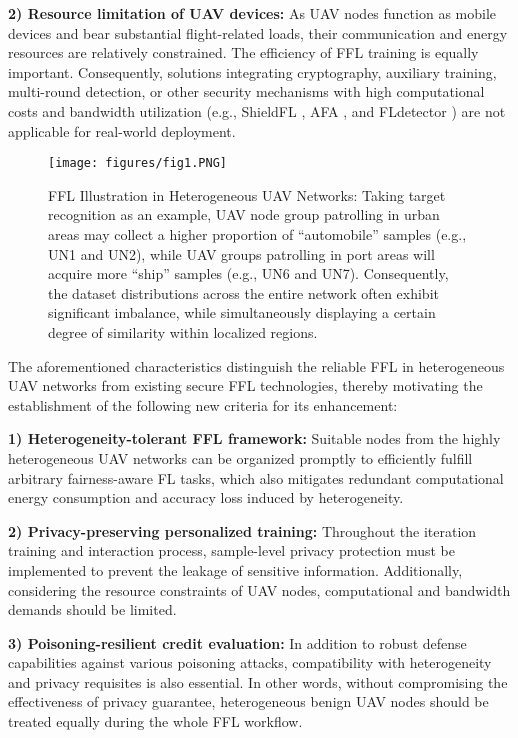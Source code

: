 \documentclass[lettersize,journal]{IEEEtran}
\begin{document}
\textbf{2) Resource limitation of UAV devices:} As UAV nodes function as mobile devices and bear substantial flight-related loads, their communication and energy resources are relatively constrained. The efficiency of FFL training is equally important. Consequently, solutions integrating cryptography, auxiliary training, multi-round detection, or other security mechanisms with high computational costs and bandwidth utilization (e.g., ShieldFL \cite{ma2022shieldfl}, AFA \cite{munoz2019byzantine-AFA}, and FLdetector \cite{zhang2022fldetector}) are not applicable for real-world deployment.

\begin{figure}[!t]
\centering
\texttt{[image: figures/fig1.PNG]}
\caption{FFL Illustration in Heterogeneous UAV Networks: Taking target recognition as an example, UAV node group patrolling in urban areas may collect a higher proportion of ``automobile'' samples (e.g., UN1 and UN2), while UAV groups patrolling in port areas will acquire more ``ship'' samples (e.g., UN6 and UN7). Consequently, the dataset distributions across the entire network often exhibit significant imbalance, while simultaneously displaying a certain degree of similarity within localized regions.
}
\label{fig1:UAV-Network}
\end{figure}

The aforementioned characteristics distinguish the reliable FFL in heterogeneous UAV networks from existing secure FFL technologies, thereby motivating the establishment of the following new criteria for its enhancement:

\textbf{1) Heterogeneity-tolerant FFL framework:} Suitable nodes from the highly heterogeneous UAV networks can be organized promptly to efficiently fulfill arbitrary fairness-aware FL tasks, which also mitigates redundant computational energy consumption and accuracy loss induced by heterogeneity.

\textbf{2) Privacy-preserving personalized training:} Throughout the iteration training and interaction process, sample-level privacy protection must be implemented to prevent the leakage of sensitive information. Additionally, considering the resource constraints of UAV nodes, computational and bandwidth demands should be limited.

\textbf{3) Poisoning-resilient credit evaluation:} In addition to robust defense capabilities against various poisoning attacks, compatibility with heterogeneity and privacy requisites is also essential. In other words, without compromising the effectiveness of privacy guarantee, heterogeneous benign UAV nodes should be treated equally during the whole FFL workflow.%
\end{document}
